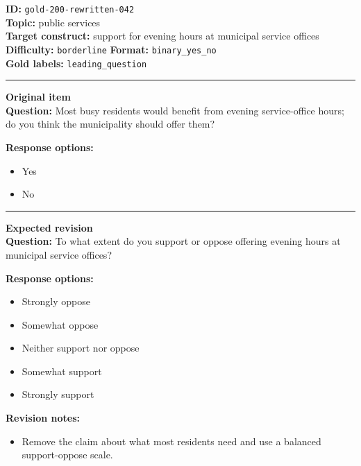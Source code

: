 \documentclass[10pt,a4paper]{article}
\newcommand{\sectionline}{\vspace{0.15em}\hrule\vspace{0.35em}}
\begin{document}
\begin{tcolorbox}[colframe=FlawRed,colback=white,colbacktitle=FlawRed!9,coltitle=black,title={Item 042\hfill Flawed item}]
\textbf{ID:} \texttt{gold-200-rewritten-042}\\
\textbf{Topic:} public services\\
\textbf{Target construct:} support for evening hours at municipal service offices\\
\textbf{Difficulty:} \texttt{borderline} \quad \textbf{Format:} \texttt{binary\_yes\_no}\\
\textbf{Gold labels:} \texttt{leading\_question}\\
\sectionline
\textbf{Original item}\\
\textbf{Question:} Most busy residents would benefit from evening service-office hours; do you think the municipality should offer them?
\par\textbf{Response options:}
\begin{itemize}
\item Yes
\item No
\end{itemize}
\sectionline
\textbf{Expected revision}\\
\textbf{Question:} To what extent do you support or oppose offering evening hours at municipal service offices?
\par\textbf{Response options:}
\begin{itemize}
\item Strongly oppose
\item Somewhat oppose
\item Neither support nor oppose
\item Somewhat support
\item Strongly support
\end{itemize}
\par\textbf{Revision notes:}
\begin{itemize}
\item Remove the claim about what most residents need and use a balanced support-oppose scale.
\end{itemize}
\end{tcolorbox}
\end{document}
